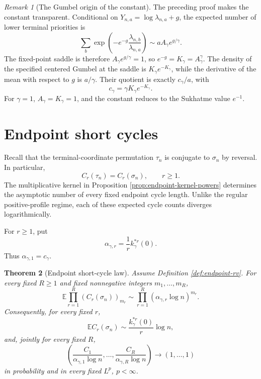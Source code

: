 \documentclass[11pt]{article}
\newtheorem{theorem}{Theorem}[section]
\theoremstyle{remark}
\newtheorem{remark}[theorem]{Remark}
\newcommand{\Ee}{\mathbb E}
\begin{document}
\begin{remark}[The Gumbel origin of the constant]\label{rem:gumbel-endpoint-constant}
The preceding proof makes the constant transparent.  Conditional on
\(Y_{n,a}=\log\lambda_{n,a}+g\), the expected number of lower terminal priorities
is
\[
        \sum_b\exp\left(-e^{-g}\frac{\lambda_{n,b}}{\lambda_{n,a}}\right)
        \sim aA_\gamma e^{g/\gamma}.
\]
The fixed-point saddle is therefore
\(A_\gamma e^{g/\gamma}=1\), so
\(e^{-g}=K_\gamma=A_\gamma^\gamma\).  The density of the specified centered
Gumbel at the saddle is \(K_\gamma e^{-K_\gamma}\), while the derivative of the
mean with respect to \(g\) is \(a/\gamma\).  Their quotient is exactly
\(c_\gamma/a\), with
\[
        c_\gamma=\gamma K_\gamma e^{-K_\gamma}.
\]
For \(\gamma=1\), \(A_\gamma=K_\gamma=1\), and the constant reduces to the
Sukhatme value \(e^{-1}\).
\end{remark}

\section{Endpoint short cycles}
\label{sec:endpoint-short-cycles}

Recall that the terminal-coordinate permutation $\tau_n$ is conjugate to
$\sigma_n$ by reversal.  In particular,
\[
        C_r(\tau_n)=C_r(\sigma_n),\qquad r\ge1.
\]
The multiplicative kernel in Proposition
\ref{prop:endpoint-kernel-powers} determines the asymptotic number of every
fixed endpoint cycle length.  Unlike the regular positive-profile regime, each
of these expected cycle counts diverges logarithmically.

For $r\ge1$, put
\[
        \alpha_{\gamma,r}=\frac1r k_\gamma^{*r}(0).
\]
Thus $\alpha_{\gamma,1}=c_\gamma$.

\begin{theorem}[Endpoint short-cycle law]
\label{thm:endpoint-short-cycles}
Assume Definition \ref{def:endpoint-rv}.  For every fixed $R\ge1$ and fixed
nonnegative integers $m_1,\ldots,m_R$,
\[
        \Ee\prod_{r=1}^R(C_r(\sigma_n))_{m_r}
        \sim\prod_{r=1}^R
        (\alpha_{\gamma,r}\log n)^{m_r}.
\]
Consequently, for every fixed $r$,
\[
        \Ee C_r(\sigma_n)
        \sim\frac{k_\gamma^{*r}(0)}r\log n,
\]
and, jointly for every fixed $R$,
\[
        \left(
        \frac{C_1}{\alpha_{\gamma,1}\log n},\ldots,
        \frac{C_R}{\alpha_{\gamma,R}\log n}
        \right)\longrightarrow(1,\ldots,1)
\]
in probability and in every fixed $L^p$, $p<\infty$.
\end{theorem}
\end{document}
